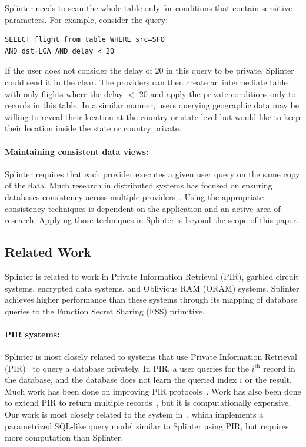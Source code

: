 Splinter needs to scan the whole table only for conditions 
that contain sensitive parameters.
For example, consider the query:
\begin{verbatim}
SELECT flight from table WHERE src=SFO 
AND dst=LGA AND delay < 20
\end{verbatim}
If the user does not consider the delay of 20 in this query to be
private, Splinter could send it in the clear.
The providers can then create an intermediate
table with only flights where the delay $<$ 20 and apply the private
conditions only to records in this table.
In a similar manner, users querying geographic data may be willing to
reveal their location at the country or state level but would like to
keep their location inside the state or country private.

\paragraph{Maintaining consistent data views:}
Splinter requires that each provider executes a given user
query on the same copy of the data. 
Much research in distributed systems has focused on ensuring
databases consistency across multiple providers~\cite{spanner, ongaro:raft, tu:silo}.
Using the appropriate consistency techniques is dependent
on the application and an active area of research.
Applying those techniques in Splinter is beyond the scope
of this paper.


\subsection{Related Work}
\label{spl-sec:related}
Splinter is related to work in Private Information Retrieval (PIR),
garbled circuit systems, encrypted data systems, 
and Oblivious RAM (ORAM) systems. Splinter achieves higher performance than these systems 
through its mapping of database queries to the Function Secret Sharing (FSS) primitive.

\paragraph{PIR systems:}
Splinter is most closely related to systems that use Private
Information Retrieval (PIR)~\cite{chor1998private} to query a database privately.
In PIR, a user queries for the $i^\mathrm{th}$ record in the database, and the database
does not learn the queried index $i$ or the result.
Much work has been done on improving 
PIR protocols~\cite{ostrovsky2007survey, olumofin2011revisiting}. 
Work has also been done to extend PIR to return multiple records~\cite{groth2010multi},
but it is computationally expensive.
Our work is most closely related to the system in~\cite{goldberg}, which implements
a parametrized SQL-like query model similar to Splinter using PIR, but requires
more computation than Splinter.

